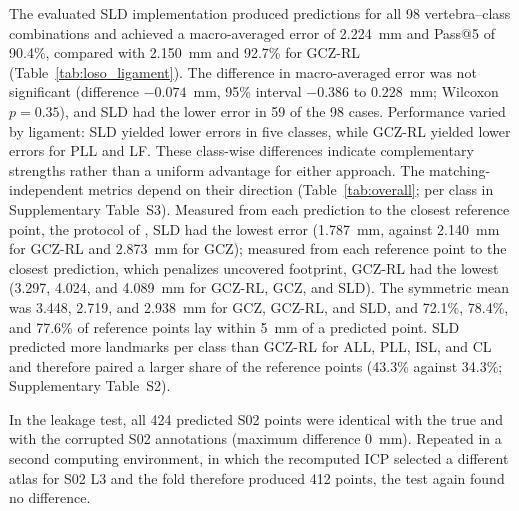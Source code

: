 \documentclass[5p,times,twocolumn,authoryear]{elsarticle}
\newif\ifhighlight
\newcommand{\rev}[1]{\ifhighlight{\color{revcolor}#1}\else#1\fi}
\begin{document}
The evaluated SLD implementation produced predictions for all 98 vertebra--class combinations and achieved a macro-averaged error of 2.224~mm and Pass@5 of 90.4\%, compared with 2.150~mm and 92.7\% for GCZ-RL (Table~\ref{tab:loso_ligament}). The difference in macro-averaged error was not significant (difference $-0.074$~mm, 95\% interval $-0.386$ to $0.228$~mm; Wilcoxon $p=0.35$), and SLD had the lower error in 59 of the 98 cases. Performance varied by ligament: SLD yielded lower errors in five classes, while GCZ-RL yielded lower errors for PLL and LF. These class-wise differences indicate complementary strengths rather than a uniform advantage for either approach. The matching-independent metrics depend on their direction (\rev{Table~\ref{tab:overall}; per class in} Supplementary Table~S3). Measured from each prediction to the closest reference point, the protocol of \citet{blomenkamp2026sld}, SLD had the lowest error (1.787~mm, against 2.140~mm for GCZ-RL and 2.873~mm for GCZ); measured from each reference point to the closest prediction, which penalizes uncovered footprint, GCZ-RL had the lowest (3.297, 4.024, and 4.089~mm for GCZ-RL, GCZ, and SLD). The symmetric mean was 3.448, 2.719, and 2.938~mm for GCZ, GCZ-RL, and SLD, and 72.1\%, 78.4\%, and 77.6\% of reference points lay within 5~mm of a predicted point. SLD predicted more landmarks per class than GCZ-RL for ALL, PLL, ISL, and CL and therefore paired a larger share of the reference points (43.3\% against 34.3\%; Supplementary Table~S2).

In the leakage test, all 424 predicted S02 points were identical with the true and with the corrupted S02 annotations (maximum difference 0~mm). \rev{Repeated in a second computing environment, in which the recomputed ICP selected a different atlas for S02 L3 and the fold therefore produced 412 points, the test again found no difference.}
\end{document}

